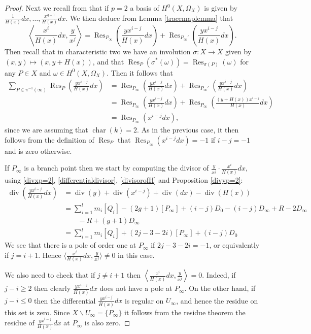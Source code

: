 \documentclass[draft, 11pt]{article} %
\theoremstyle{plain}
\theoremstyle{remark}
\newcommand{\ra}{\rightarrow}
\newcommand{\hzero}{{H^0(X,\Omega_X)}}
\DeclareMathOperator{\res}{Res}
\DeclareMathOperator{\di}{div}
\DeclareMathOperator{\cha}{char}
\begin{document}
\begin{proof}
Next we recall from \cite[Chap 7, Prop. 4.26]{liu} that if $p=2$ a basis of $\hzero$ is given by $\frac{1}{H(x)}dx, \ldots, \frac{x^{g-1}}{H(x)}dx$.
We then deduce from Lemma \ref{tracemaplemma} that
\[
\left \langle \frac{x^i}{H(x)}dx, \frac{y}{x^j} \right \rangle = \res_{P_\infty} \left( \frac{yx^{i-j}}{H(x)}dx \right) + \res_{P_\infty'}\left( \frac{yx^{i-j}}{H(x)} dx \right).
\]
Then recall that in characteristic two we have an involution $\sigma \colon X \ra X$ given by $(x,y) \mapsto (x, y + H(x))$, and that $\res_P(\sigma^*(\omega)) = \res_{\sigma(P)}(\omega)$ for any $P \in X$ and $\omega\in \hzero$.
Then it follows that
\begin{align*}
\sum_{P \in \pi^{-1}(\infty)} \res_P \left( \frac{yx^{i-j}}{H(x)}dx \right) & = \res_{P_\infty} \left( \frac{yx^{i-j}}{H(x)} dx \right) + \res_{P_\infty'}\left( \frac{yx^{i-j}}{H(x)} dx\right) \\
& = \res_{P_ \infty} \left( \frac{yx^{i-j}}{H(x)}dx \right) + \res_{P_ \infty} \left( \frac{(y+H(x))x^{i-j}}{H(x)}dx \right) \\
& = \res_{P_\infty}(x^{i-j}dx),
\end{align*}
since we are assuming that $\cha(k) = 2$.
As in the previous case, it then follows from the definition of $\res_P$ that $\res_{P_\infty}(x^{i-j}dx) = -1$ if $i-j = -1$ and is zero otherwise.



If $P_\infty$ is a branch point then we start by computing the divisor of $ \frac{y}{x^j} \cdot \frac{x^i}{H(x)}dx$, using \eqref{divxp=2}, \eqref{differentialdivisor}, \eqref{divisorofH} and Proposition \ref{divyp=2}:
\begin{align*}
\di\left( \frac{yx^{i-j}}{H(x)}dx \right) & = \di(y) + \di(x^{i-j}) + \di( dx) - \di(H(x)) \\
& = \sum_{i=1}^l m_i[Q_i] - (2g+ 1 )[P_\infty] + (i-j)D_0 - (i-j)D_\infty + R - 2D_\infty \\
& \qquad - R + (g+1)D_\infty\\
& = \sum_{i=1}^l m_i[Q_i] + (2j-3-2i)[P_\infty] + (i-j)D_0
\end{align*}
We see that there is a pole of order one at $P_\infty$ if $2j - 3 - 2i = -1$, or equivalently if $j = i+1$.
Hence $\langle \frac{x^i}{H(x)}dx, \frac{y}{x^j} \rangle \neq 0$ in this case.

We also need to check that if $j \neq i+1$ then $\left \langle \frac{x^i}{H(x)}dx, \frac{y}{x^j} \right \rangle = 0$.
Indeed, if $j-i \geq 2$ then clearly $\frac{yx^{i-j}}{H(x)}dx$ does not have a pole at $P_\infty$.
On the other hand, if $j-i \leq 0$ then the differential $\frac{yx^{i-j}}{H(x)}dx$ is regular on $U_\infty$, and hence the residue on this set is zero.
Since $X \backslash U_\infty = \{P_\infty\}$ it follows from the residue theorem the residue of $\frac{yx^{i-j}}{H(x)}dx$ at $P_\infty$ is also zero.
\end{proof}
\end{document}
